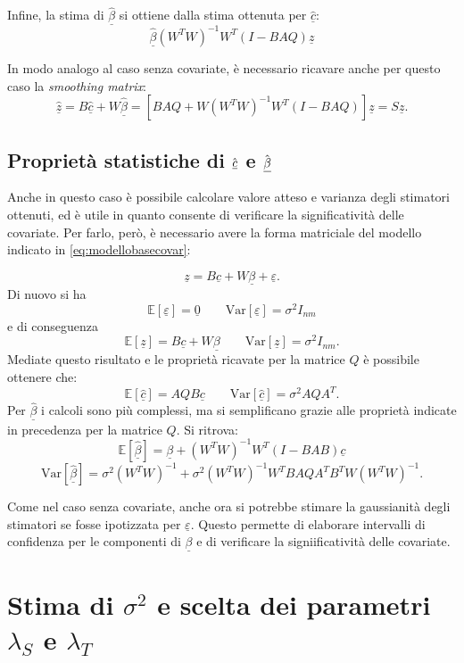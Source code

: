 \documentclass[a4paper,11pt,twoside,openright]{book}							%
\begin{document}
Infine, la stima di $\hat  {\underline \beta}$ si ottiene dalla stima ottenuta per $\hat  {\underline c}$:
$$
\hat{\underline{\beta}}(W^TW)^{-1}W^T(I-B AQ)\underline z
$$

In modo analogo al caso senza covariate, è necessario ricavare anche per questo caso la \textit{smoothing matrix}:
$$
\hat  {\underline z} =B\hat  {\underline c} + W \hat  {\underline \beta} = [B AQ + W(W^TW)^{-1}W^T(I-B AQ)]\underline z = S\underline z .
$$

\subsection{Proprietà statistiche di $\hat  {\protect\underline{c}}$ e $\hat  {\protect\underline{\beta}}$}
\label{sec:IC}
Anche in questo caso è possibile calcolare valore atteso e varianza degli stimatori ottenuti, ed è utile in quanto consente di verificare la significatività delle covariate. Per farlo, però, è necessario avere la forma matriciale del modello indicato in \ref{eq:modellobasecovar}:

\begin{equation}
\label{eq:modellobasecovarmatric}
\underline z=B \underline c + W \underline \beta + \underline \varepsilon .
\end{equation}
Di nuovo si ha 
$$
\mathbb{E}[\underline \varepsilon] = \underline 0 \qquad \mathrm{Var}[\underline \varepsilon] = \sigma^2 I_{nm}
$$
e di conseguenza
$$
\mathbb{E}[\underline z] = B \underline c + W \underline \beta \qquad \mathrm{Var}[\underline z] = \sigma^2 I_{nm} .
$$
Mediate questo risultato e le proprietà ricavate per la matrice $Q$ è possibile ottenere che:
$$
\mathbb{E}[\hat  {\underline c}] = AQB \underline c \qquad \mathrm{Var}[\hat  {\underline c}] = \sigma^2 AQA^T .
$$
Per $\hat  {\underline \beta}$ i calcoli sono più complessi, ma si semplificano grazie alle proprietà indicate in precedenza per la matrice $Q$. Si ritrova:
$$
\mathbb{E}[\hat  {\underline \beta}] = \underline \beta + (W^TW)^{-1}W^T(I-B AB)\underline c
$$
$$ \mathrm{Var}[\hat  {\underline \beta}] = \sigma^2 (W^TW)^{-1} + \sigma^2 (W^TW)^{-1}W^T B A Q A^T B^T W(W^TW)^{-1}.
$$

Come nel caso senza covariate, anche ora si potrebbe stimare la gaussianità degli stimatori se fosse ipotizzata per $\underline \varepsilon$. Questo permette di elaborare intervalli di confidenza per le componenti di $\underline \beta$ e di verificare la signiificatività delle covariate.


\section{Stima di $\sigma^2$ e scelta dei parametri $\lambda_S$ e $\lambda_T$}
\label{sez:GCV}
\end{document}

